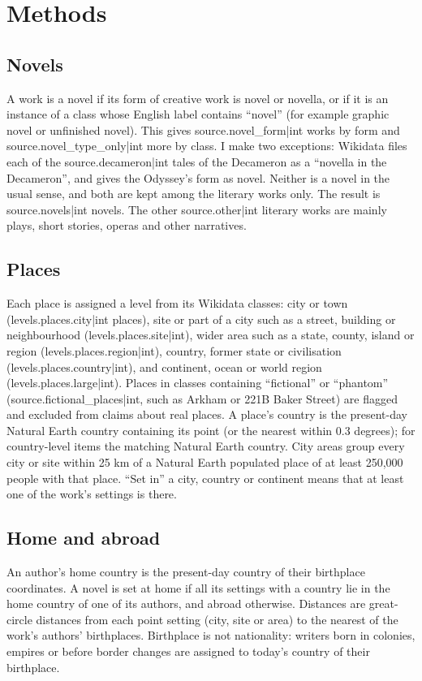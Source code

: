 \documentclass[11pt,a4paper]{article}
\begin{document}
\section{Methods}
\subsection{Novels}
A work is a novel if its form of creative work is novel or novella, or if it is an instance of a class whose English label contains ``novel'' (for example graphic novel or unfinished novel). This gives {{source.novel_form|int}} works by form and {{source.novel_type_only|int}} more by class. I make two exceptions: Wikidata files each of the {{source.decameron|int}} tales of the Decameron as a ``novella in the Decameron'', and gives the Odyssey's form as novel. Neither is a novel in the usual sense, and both are kept among the literary works only. The result is {{source.novels|int}} novels. The other {{source.other|int}} literary works are mainly plays, short stories, operas and other narratives.

\subsection{Places}
Each place is assigned a level from its Wikidata classes: city or town ({{levels.places.city|int}} places), site or part of a city such as a street, building or neighbourhood ({{levels.places.site|int}}), wider area such as a state, county, island or region ({{levels.places.region|int}}), country, former state or civilisation ({{levels.places.country|int}}), and continent, ocean or world region ({{levels.places.large|int}}). Places in classes containing ``fictional'' or ``phantom'' ({{source.fictional_places|int}}, such as Arkham or 221B Baker Street) are flagged and excluded from claims about real places. A place's country is the present-day Natural Earth country containing its point (or the nearest within 0.3 degrees); for country-level items the matching Natural Earth country. City areas group every city or site within 25 km of a Natural Earth populated place of at least 250,000 people with that place. ``Set in'' a city, country or continent means that at least one of the work's settings is there.

\subsection{Home and abroad}
An author's home country is the present-day country of their birthplace coordinates. A novel is set at home if all its settings with a country lie in the home country of one of its authors, and abroad otherwise. Distances are great-circle distances from each point setting (city, site or area) to the nearest of the work's authors' birthplaces. Birthplace is not nationality: writers born in colonies, empires or before border changes are assigned to today's country of their birthplace.
\end{document}
